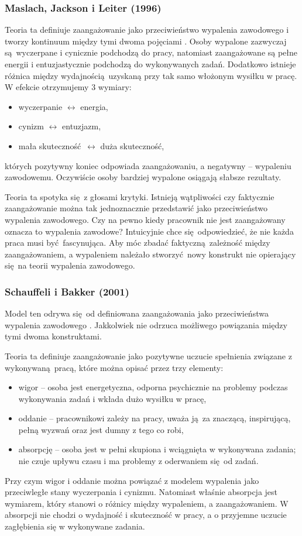 \subsubsection{Maslach, Jackson i Leiter (1996)}
\label{sec:model-maslach}
Teoria ta definiuje zaangażowanie jako przeciwieństwo wypalenia zawodowego i tworzy kontinuum między tymi dwoma pojęciami \cite{maslach1997truth}. Osoby wypalone zazwyczaj są wyczerpane i cynicznie podchodzą do pracy, natomiast zaangażowane są pełne energii i entuzjastycznie podchodzą do wykonywanych zadań. Dodatkowo istnieje różnica między wydajnością uzyskaną przy tak samo włożonym wysiłku w pracę. W efekcie otrzymujemy 3 wymiary:
\begin{itemize}
\item wyczerpanie $\leftrightarrow$ energia,
\item cynizm $\leftrightarrow$ entuzjazm,
\item mała skuteczność $\leftrightarrow$ duża skuteczność,
\end{itemize}
których pozytywny koniec odpowiada zaangażowaniu, a negatywny -- wypaleniu zawodowemu. Oczywiście osoby bardziej wypalone osiągają słabsze rezultaty.

Teoria ta spotyka się z głosami krytyki. Istnieją wątpliwości czy faktycznie zaangażowanie można tak jednoznacznie przedstawić jako przeciwieństwo wypalenia zawodowego. Czy na pewno kiedy pracownik nie jest zaangażowany oznacza to wypalenia zawodowe? Intuicyjnie chce się odpowiedzieć, że nie każda praca musi być fascynująca. Aby móc zbadać faktyczną zależność między zaangażowaniem, a wypaleniem należało stworzyć nowy konstrukt nie opierający się na teorii wypalenia zawodowego.

\subsubsection{Schauffeli i Bakker (2001)}
\label{sec:model-schauffeli}
Model ten odrywa się od definiowana zaangażowania jako przeciwieństwa wypalenia zawodowego \cite{schaufeli2002measurement}. Jakkolwiek nie odrzuca możliwego powiązania między tymi dwoma konstruktami. 

Teoria ta definiuje zaangażowanie jako pozytywne uczucie spełnienia związane z wykonywaną pracą, które można opisać przez trzy elementy:
\begin{itemize}
\item wigor -- osoba jest energetyczna, odporna psychicznie na problemy podczas wykonywania zadań i wkłada dużo wysiłku w pracę,
\item oddanie -- pracownikowi zależy na pracy, uważa ją za znaczącą, inspirującą, pełną wyzwań oraz jest dumny z tego co robi,
\item absorpcję -- osoba jest w pełni skupiona i wciągnięta w wykonywana zadania; nie czuje upływu czasu i ma problemy z oderwaniem się od zadań.
\end{itemize}
Przy czym wigor i oddanie można powiązać z modelem wypalenia jako przeciwległe stany wyczerpania i cynizmu. Natomiast właśnie absorpcja jest wymiarem, który stanowi o różnicy między wypaleniem, a zaangażowaniem. W absorpcji nie chodzi o wydajność i skuteczność w pracy, a o przyjemne uczucie zagłębienia się w wykonywane zadania.

